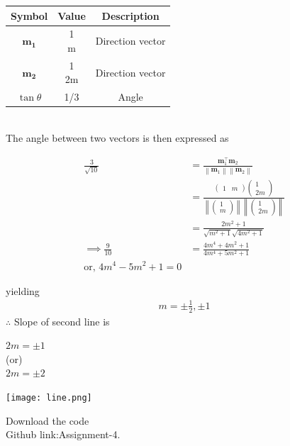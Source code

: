 \documentclass[10pt,a4paper]{report}
\newcommand{\myvec}[1]{\ensuremath{\begin{pmatrix}#1\end{pmatrix}}}
\let\vec\mathbf
\providecommand{\norm}[1]{\left\lVert#1\right\rVert}
\let\vec\mathbf
\begin{document}
\begin{multicols}{2}
\begin{tabular}{|c|c|c|}
	\hline
	\textbf{Symbol}&\textbf{Value}&\textbf{Description}\\
	\hline
	$\vec{m_1}$ &\myvec{1\\m}& Direction vector\\
	\hline
    $\vec{m_2}$ &\myvec{1\\2m}&Direction vector\\
	\hline
    $\tan\theta$ &1/3& Angle\\
	\hline
\end{tabular}
\\
\vspace{10cm}
\fi
The angle between two vectors is then expressed as

\begin{align}
	\frac{3}{\sqrt{10}} &= \frac{\vec{m}_1^\top \vec{m}_2}{\norm{\vec{m}_1}\norm{\vec{m}_2}}
	\\
	&= \frac{\myvec{1 &  m}\myvec{1 \\ 2m}}{\norm{\myvec{1\\m}}\norm{\myvec{1\\2m}}}
\\
	&= \frac{2m^2 +1}{\sqrt{m^2 + 1}\sqrt{4m^2 + 1}}
	\\
	\implies \frac{9}{10}&=\frac{4m^4 + 4m^2 +1}{4m^4 + 5m^2 +1}
\\
	\text{or, } 4m^4 - 5m^2 +1 = 0
\end{align}

yielding
\begin{align}
m=\pm \frac{1}{2}, 
\pm 1
\end{align}
\iffalse
$\therefore $ Slope of second line is
\begin{center}
$ 2m=\pm 1$\\
    (or)\\
    $2m=\pm 2$
\end{center}
\begin{center}
 \texttt{[image: line.png]}  
 \end{center}\vspace{1mm}
\raggedright  Download the code \\
Github link:{Assignment-4}.
\end{multicols}
\end{document}
